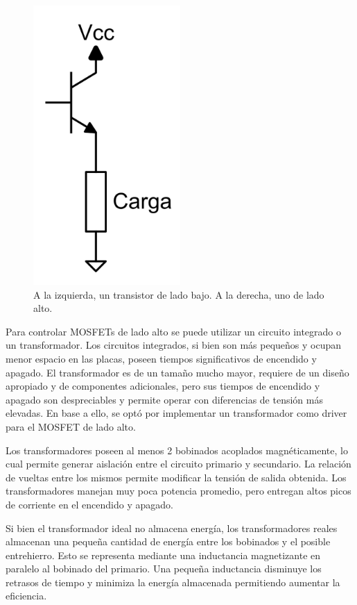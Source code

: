\begin{figure}[H]
\begin{minipage}{0.45\textwidth}
        \includegraphics[width=0.5\textwidth]{images/low_high_side/High_Side.png}
    \end{minipage}
    \caption{A la izquierda, un transistor de lado bajo. A la derecha, uno de lado alto.}
    \label{fig:high_side}
\end{figure}

Para controlar MOSFETs de lado alto se puede utilizar un circuito integrado o un transformador. 
Los circuitos integrados, si bien son más pequeños y ocupan menor espacio en las placas, 
poseen tiempos significativos de encendido y apagado. 
El transformador es de un tamaño mucho mayor, requiere de un diseño apropiado y de componentes adicionales,
pero sus tiempos de encendido y apagado son despreciables y permite operar con diferencias de tensión más elevadas.
En base a ello, se optó por implementar un transformador como driver para el MOSFET de lado alto. 

Los transformadores poseen al menos 2 bobinados acoplados magnéticamente, 
lo cual permite generar aislación entre el circuito primario y secundario. 
La relación de vueltas entre los mismos permite modificar la tensión de salida obtenida. 
Los transformadores manejan muy poca potencia promedio, pero entregan altos picos de corriente en el encendido y apagado.

Si bien el transformador ideal no almacena energía, los transformadores reales 
almacenan una pequeña cantidad de energía entre los bobinados y el posible entrehierro. 
Esto se representa mediante una inductancia magnetizante en paralelo al bobinado del primario. 
Una pequeña inductancia disminuye los retrasos de tiempo y minimiza la energía almacenada permitiendo aumentar la eficiencia. 

